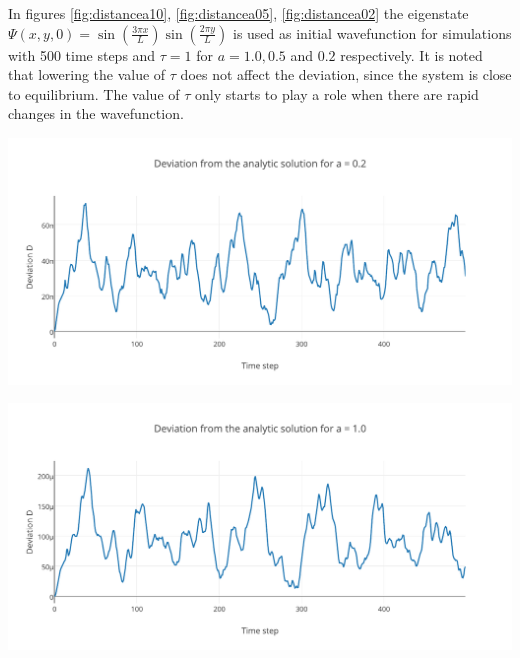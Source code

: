 In figures \ref{fig:distancea10}, \ref{fig:distancea05}, \ref{fig:distancea02} the eigenstate $\Psi(x,y,0) = \sin(\frac{3 \pi x}{L})\sin(\frac{2 \pi y}{L})$ is used as initial wavefunction for simulations with 500 time steps and $\tau = 1$ for $a = 1.0, 0.5$ and $0.2$ respectively. It is noted that lowering the value of $\tau$ does not affect the deviation, since the system is close to equilibrium. The value of $\tau$ only starts to play a role when there are rapid changes in the wavefunction.
\begin{Figure}
    \centering
    \includegraphics[width=\linewidth]{distancea10.pdf}
    \label{fig:distancea10}
\end{Figure}
\begin{Figure}
    \centering
    \includegraphics[width=\linewidth]{distancea05.pdf}
    \label{fig:distancea05}
\end{Figure}
